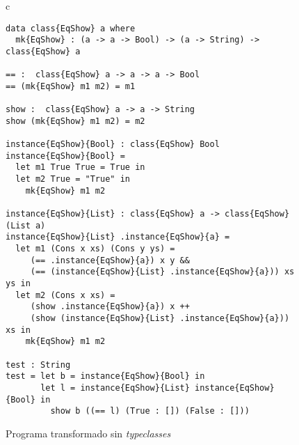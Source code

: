 \begin{figure}[!htp]
\begin{center}
\begin{framed}
\begin{tabular}{c}
\begin{lstlisting}[mathescape=true,basicstyle=\footnotesize\tt]
data class{EqShow} a where
  mk{EqShow} : (a -> a -> Bool) -> (a -> String) -> class{EqShow} a

== :  class{EqShow} a -> a -> a -> Bool
== (mk{EqShow} m1 m2) = m1

show :  class{EqShow} a -> a -> String
show (mk{EqShow} m1 m2) = m2

instance{EqShow}{Bool} : class{EqShow} Bool
instance{EqShow}{Bool} =
  let m1 True True = True in
  let m2 True = "True" in
    mk{EqShow} m1 m2

instance{EqShow}{List} : class{EqShow} a -> class{EqShow} (List a) 
instance{EqShow}{List} .instance{EqShow}{a} =
  let m1 (Cons x xs) (Cons y ys) =
     (== .instance{EqShow}{a}) x y &&
     (== (instance{EqShow}{List} .instance{EqShow}{a})) xs ys in
  let m2 (Cons x xs) =
     (show .instance{EqShow}{a}) x ++
     (show (instance{EqShow}{List} .instance{EqShow}{a})) xs in
    mk{EqShow} m1 m2

test : String
test = let b = instance{EqShow}{Bool} in
       let l = instance{EqShow}{List} instance{EqShow}{Bool} in
         show b ((== l) (True : []) (False : []))
\end{lstlisting}
\end{tabular}
\caption{Programa transformado sin {\em typeclasses}}
\end{framed}
\end{center}
\label{programa_sin_typeclasses}
\end{figure}


